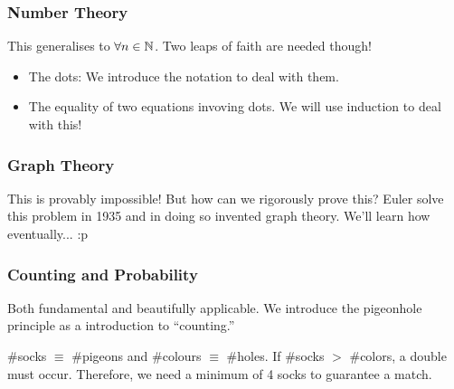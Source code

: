 \documentclass{report}
\begin{document}
\subsubsection*{Number Theory}
This generalises to $\forall n \in \mathbb{N}$. Two leaps of faith are needed though!
\begin{itemize}
	\item The dots: We introduce the notation to deal with them.
	\item The equality of two equations invoving dots. We will use induction to deal with this!
\end{itemize}

\subsubsection*{Graph Theory}
This is provably impossible! But how can we rigorously prove this? Euler solve this problem in 1935 and in doing so invented graph theory. We'll learn how eventually... :p

\subsubsection*{Counting and Probability}
Both fundamental and beautifully applicable. We introduce the pigeonhole principle as a introduction to ``counting.''

\sol \#socks $\equiv$ \#pigeons and \#colours $\equiv$ \#holes. If \#socks $>$ \#colors, a double must occur. Therefore, we need a minimum of 4 socks to guarantee a match.
\end{document}
